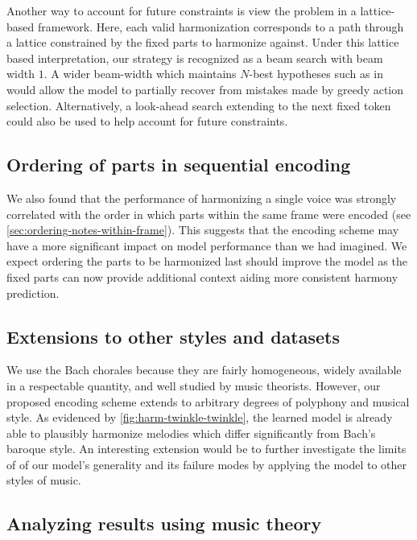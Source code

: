 Another way to account for future constraints is view the problem in a
lattice-based framework. Here, each valid harmonization corresponds to a path
through a lattice constrained by the fixed parts to harmonize against. Under
this lattice based interpretation, our strategy is recognized as a beam search
with beam width $1$. A wider beam-width which maintains $N$-best hypotheses
such as in \citet{liu2014efficient} would allow the model to partially recover
from mistakes made by greedy action selection. Alternatively, a
look-ahead search \cite{norvig1992paradigms} extending to the next fixed token
could also be used to help account for future constraints.

\subsection{Ordering of parts in sequential encoding}

We also found that the performance of harmonizing a single voice was strongly
correlated with the order in which parts within the same frame were encoded
(see \vref{sec:ordering-notes-within-frame}). This suggests that the encoding
scheme may have a more significant impact on model performance than we had
imagined. We expect ordering the parts to be harmonized last should improve the
model as the fixed parts can now provide additional context aiding more
consistent harmony prediction.

\subsection{Extensions to other styles and datasets}

We use the Bach chorales because they are fairly homogeneous, widely available
in a respectable quantity, and well studied by music theorists. However, our
proposed encoding scheme extends to arbitrary degrees of polyphony and musical
style. As evidenced by \vref{fig:harm-twinkle-twinkle}, the learned model is
already able to plausibly harmonize melodies which differ significantly from
Bach's baroque style. An interesting extension would be to further investigate
the limits of of our model's generality and its failure modes by applying
the model to other styles of music.

\subsection{Analyzing results using music theory}

